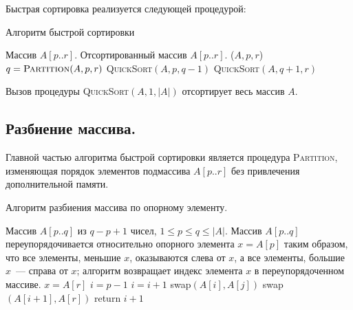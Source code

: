 \documentclass[a4paper,12pt]{article}
\newcommand{\algname}[1]{\textsc{#1}}
\begin{document}
Быстрая сортировка реализуется следующей процедурой:

\begin{algorithm}[H]
	\caption{Алгоритм быстрой сортировки}
	\label{algo:quick-sort}
	\begin{algorithmic}[1]
		\Require Массив \(A[p..r]\).
		\Ensure Отсортированный массив \(A[p..r]\).
		($A, p, r$)
			\State \(q = \algname{Partition}(A, p, r)\)
			\State \algname{QuickSort}\((A, p, q - 1)\)
			\State \algname{QuickSort}\((A, q + 1, r)\)
		\EndIf
		\EndFunction
	\end{algorithmic}
\end{algorithm}

Вызов процедуры \textsc{QuickSort}\((A, 1, |A|)\) отсортирует весь массив \(A\).

\subsection{Разбиение массива.}

Главной частью алгоритма быстрой сортировки является процедура \algname{Partition}, изменяющая порядок элементов подмассива \(A[p..r]\) без привлечения дополнительной памяти.

\begin{algorithm}[H]
	\caption{Алгоритм разбиения массива по опорному элементу.}
	\label{algo:partition}
	\begin{algorithmic}[1]
		\Require Массив $A[p..q]$ из $q - p + 1$ чисел, $1 \leq p \leq q \leq |A|$. 
		\Ensure Массив $A[p..q]$ переупорядочивается относительно опорного элемента $x = A[p]$ таким образом, что все элементы, меньшие $x$, оказываются слева от $x$, а все элементы, большие $x$~--- справа от $x$; алгоритм возвращает индекс элемента $x$ в переупорядоченном массиве.
		\State \(x = A[r]\)
		\State \(i = p - 1\)
				\State \(i = i + 1\)
				\State swap\((A[i], A[j])\)
			\EndIf
		\EndFor
		\State swap\((A[i + 1], A[r])\)
		\State return \(i + 1\)
	\end{algorithmic}
\end{algorithm}
\end{document}
